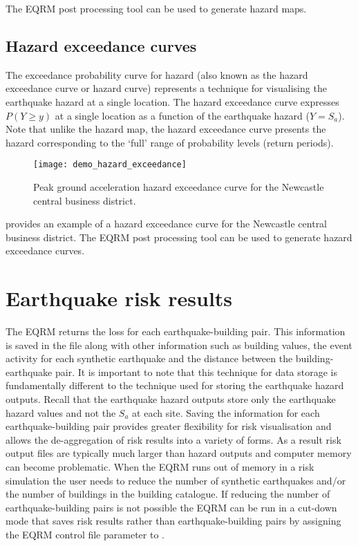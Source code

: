 The EQRM post processing tool  can
be used to generate hazard maps. 

\subsection{Hazard exceedance curves}

The exceedance probability curve for hazard (also known as the
hazard exceedance curve or hazard curve) represents a technique
for visualising the earthquake hazard at a single location. The
hazard exceedance curve expresses $P(Y \ge y)$ at a single
location as a function of the earthquake hazard ($Y = S_a$). Note
that unlike the hazard map, the hazard exceedance curve presents
the hazard corresponding to the `full' range of probability levels
(return periods).
\begin{figure}
\texttt{[image: demo\_hazard\_exceedance]}
\caption{Peak ground acceleration hazard exceedance curve for the
Newcastle central business district.}
\label{fig:risk-hzdexceedcurve}
\end{figure}
 provides an example of a hazard
exceedance curve for the Newcastle central business district. The
EQRM post processing tool  can
be used to generate hazard exceedance curves.


\section{Earthquake risk results}

The EQRM returns the loss for each earthquake-building pair. This
information is saved in the file
 along with
other information such as building values, the event activity for
each synthetic earthquake and the distance between the
building-earthquake pair. It is important to note that this
technique for data storage is fundamentally different to the
technique used for storing the earthquake hazard outputs. Recall
that the earthquake hazard outputs store only the earthquake
hazard values and not the $S_a$ at each site. Saving the
information for each earthquake-building pair provides greater
flexibility for risk visualisation and allows the de-aggregation
of risk results into a variety of forms. As a result risk output
files are typically much larger than hazard outputs and computer
memory can become problematic. When the EQRM runs out of memory in
a risk simulation the user needs to reduce the number of synthetic
earthquakes and/or the number of buildings in the building
catalogue. If reducing the number of earthquake-building pairs is
not possible the EQRM can be run in a cut-down mode that saves
risk results rather than earthquake-building pairs by assigning
the EQRM control file parameter
 to .

